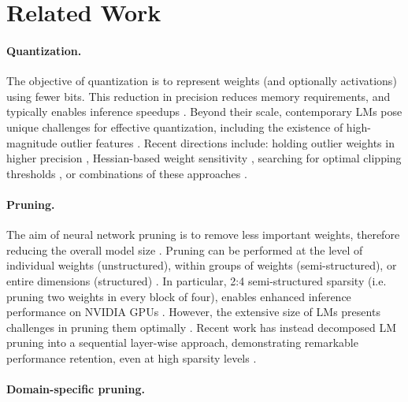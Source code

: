 \section{Related Work}
\paragraph{Quantization.}

The objective of quantization is to represent weights (and optionally activations) using fewer bits. This reduction in precision reduces memory requirements, and typically enables inference speedups \citep{gholami-etal-2021-survey}. Beyond their scale, contemporary LMs pose unique challenges for effective quantization, including the existence of high-magnitude outlier features \citep{bondarenko-etal-2021-understanding, dettmers-etal-2022-gpt3}. Recent directions include: holding outlier weights in higher precision \citep{dettmers-etal-2022-gpt3}, Hessian-based weight sensitivity \citep{frantar-etal-2023-optq}, searching for optimal clipping thresholds \citep{wei-etal-2023-outlier}, or combinations of these approaches \citep{lin-etal-2024-awq, dettmers-etal-2024-spqr}.

\paragraph{Pruning.}

The aim of neural network pruning is to remove less important weights, therefore reducing the overall model size \citep{lecun-etal-1989-optimal}. Pruning can be performed at the level of individual weights (unstructured), within groups of weights (semi-structured), or entire dimensions (structured) \citep{han-etal-2015-learning, mishra-etal-2021-accelerating, ma-etal-2023-llm}. In particular, 2:4 semi-structured sparsity (i.e. pruning two weights in every block of four), enables enhanced inference performance on NVIDIA GPUs \citep{mishra-etal-2021-accelerating}. However, the extensive size of LMs presents challenges in pruning them optimally \citep{hassibi-etal-1993-optimal}. Recent work has instead decomposed LM pruning into a sequential layer-wise approach, demonstrating remarkable performance retention, even at high sparsity levels \cite{frantar-alistarh-2023-sparsegpt, sun-etal-2024-simple, yin-etal-2024-outlier}.

\paragraph{Domain-specific pruning.}

